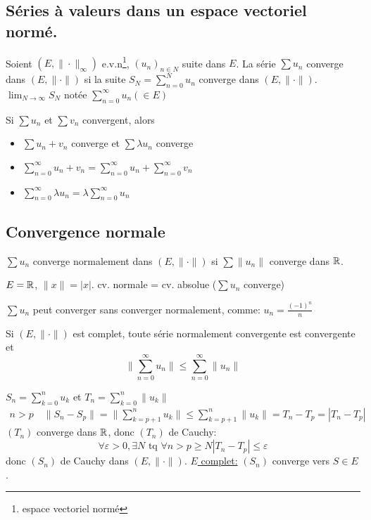 \subsection{Séries à valeurs dans un espace vectoriel normé.}
\begin{definition}
     Soient $(E, \| \cdot \|_{\infty})$ e.v.n\footnote{espace vectoriel normé}, $(u_n)_{n \in N}$ suite dans $E$. La série  $\sum u_n$ converge dans  $(E, \| \cdot \|)$ si la suite $S_N = \sum_{n=0}^{N} u_n$ converge dans $(E, \| \cdot \|)$. $\lim_{N \to \infty} S_N$ notée $\sum_{n=0}^{\infty} u_n (\in E)$
\end{definition}
\begin{remark}
   Si $\sum u_n$ et  $\sum v_n$ convergent, alors  
   \begin{itemize}
       \item $\sum u_n + v_n$ converge et  $\sum \lambda u_n$ converge
       \item $\sum_{n=0}^{\infty} u_n + v_n = \sum_{n=0}^{\infty} u_n + \sum_{n=0}^{\infty} v_n$ 
       \item $\sum_{n=0}^{\infty} \lambda u_n = \lambda \sum_{n=0}^{\infty} u_n$
   \end{itemize}
\end{remark}

\subsection{Convergence normale}
\begin{definition}
   $\sum u_n$ converge normalement dans  $(E, \| \cdot \|)$ si  $\sum \|u_n\|$ converge dans  $\mathbb{R}$. 
\end{definition}
\begin{eg}
   $E = \mathbb{R}$, $\|x\| = |x|$. cv. normale = cv. absolue ($\sum u_n$ converge) 
\end{eg}
\begin{eg}
   $\sum u_n$ peut converger sans converger normalement, comme:  $u_n = \frac{(-1)^n}{n}$ 
\end{eg}

\begin{theorem}
    Si $(E, \| \cdot \|)$ est complet, toute série normalement convergente est convergente et 
     \[
    \|\sum_{n=0}^{\infty} u_n\| \le \sum_{n=0}^{\infty} \|u_n\|
    \] 
\end{theorem}
\begin{preuve}
   $S_n = \sum_{k=0}^{n} u_k$ et $T_n = \sum_{k=0}^{n} \|u_k\|$ 
   \begin{align*}
       n > p \quad \|S_n - S_p\| = \|\sum_{k = p+1}^{n} u_k\| \le \sum_{k=p+1}^{n} \|u_k\| = T_n - T_p = |T_n - T_p|
   \end{align*}
    $(T_n)$ converge dans  $\mathbb{R}$, donc $(T_n)$ de Cauchy:
     \[
    \forall \varepsilon > 0, \exists N \text{ tq } \forall n > p \ge N |T_n - T_p| \le \varepsilon
    \] 
    donc $(S_n)$ de Cauchy dans  $(E, \| \cdot \|)$.  \underline{$E$ complet:}  $(S_n)$ converge vers  $S \in E$.
\end{preuve}
